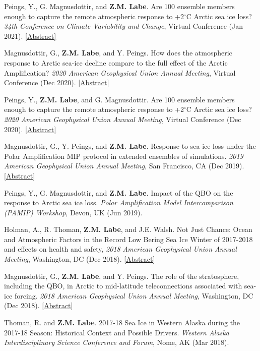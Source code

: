 \documentclass[margin,line,palatino,courier,10pt]{res}
\begin{document}
\begin{resume}
\begin{etaremune}[leftmargin=0in,topsep=0in,parsep=0in]
\item Peings, Y., G. Magnusdottir, and \textbf{Z.M. Labe}. Are 100 ensemble members enough to capture the remote atmospheric response to +2$^{\circ}$C Arctic sea ice loss? \textit{34th Conference on Climate Variability and Change}, Virtual Conference (Jan 2021). \href{https://ams.confex.com/ams/101ANNUAL/meetingapp.cgi/Paper/382352}{[Abstract]}
\item Magnusdottir, G., \textbf{Z.M. Labe}, and Y. Peings. How does the atmospheric response to Arctic sea-ice decline compare to the full effect of the Arctic Amplification? \textit{2020 American Geophysical Union Annual Meeting}, Virtual Conference (Dec 2020). \href{https://agu.confex.com/agu/fm20/meetingapp.cgi/Paper/678706}{[Abstract]}
\item Peings, Y., \textbf{Z.M. Labe}, and G. Magnusdottir. Are 100 ensemble members enough to capture the remote atmospheric response to +2$^{\circ}$C Arctic sea ice loss? \textit{2020 American Geophysical Union Annual Meeting}, Virtual Conference (Dec 2020). \href{https://agu.confex.com/agu/fm20/meetingapp.cgi/Paper/685885}{[Abstract]}
\item Magnusdottir, G., Y. Peings, and \textbf{Z.M. Labe}. Response to sea-ice loss under the Polar Amplification MIP protocol in extended ensembles of simulations. \textit{2019 American Geophysical Union Annual Meeting}, San Francisco, CA (Dec 2019). \href{https://agu.confex.com/agu/fm19/meetingapp.cgi/Paper/553470}{[Abstract]}
\item Peings, Y., G. Magnusdottir, and \textbf{Z.M. Labe}. Impact of the QBO on the response to Arctic sea ice loss. \textit{Polar Amplification Model Intercomparison (PAMIP) Workshop}, Devon, UK (Jun 2019).
\item Holman, A., R. Thoman, \textbf{Z.M. Labe}, and J.E. Walsh. Not Just Chance: Ocean and Atmospheric Factors in the Record Low Bering Sea Ice Winter of 2017-2018 and effects on health and safety, \textit{2018 American Geophysical Union Annual Meeting}, Washington, DC (Dec 2018). \href{https://agu.confex.com/agu/fm18/meetingapp.cgi/Paper/451295}{[Abstract]}
\item Magnusdottir, G., \textbf{Z.M. Labe}, and Y. Peings. The role of the stratosphere, including the QBO, in Arctic to mid-latitude teleconnections associated with sea-ice forcing. \textit{2018 American Geophysical Union Annual Meeting}, Washington, DC (Dec 2018). \href{https://agu.confex.com/agu/fm18/meetingapp.cgi/Paper/399117}{[Abstract]}
\item Thoman, R. and \textbf{Z.M. Labe}. 2017-18 Sea Ice in Western Alaska during the 2017-18 Season: Historical Context and Possible Drivers. \textit{Western Alaska Interdisciplinary Science Conference and Forum}, Nome, AK (Mar 2018). 


\end{etaremune}
\end{resume}
\end{document}
